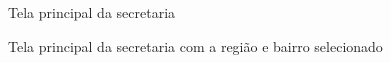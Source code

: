 \documentclass[
	article,			%
	11pt,				%
	oneside,			%
	a4paper,			%
	english,			%
	brazil,				%
	sumario=tradicional
	]{abntex2}
\begin{document}
\begin{figure}[!htbp]
 \centering
 \caption{\label{site-tela-secretaria}Tela principal da secretaria}
\end{figure}

\begin{figure}[!htbp]
 \centering
 \caption{\label{site-seleciona-bairro}Tela principal da secretaria com a região e bairro selecionado}
\end{figure}
\end{document}
